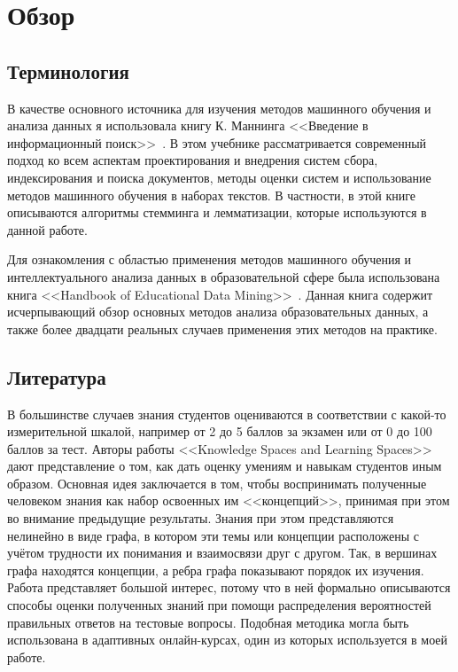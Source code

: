 \documentclass[14pt]{matmex-diploma-custom}
\begin{document}
\section{Обзор}

\subsection{Терминология}
В качестве основного источника для изучения методов машинного обучения и анализа данных я использовала книгу К. Маннинга <<Введение в информационный поиск>>~\cite{alpaydin}. В этом учебнике рассматривается современный подход ко всем аспектам проектирования и внедрения систем сбора, индексирования и поиска документов, методы оценки систем и использование методов машинного обучения в наборах текстов. В частности, в этой книге описываются алгоритмы стемминга и лемматизации, которые используются в данной работе.

Для ознакомления с областью применения методов машинного обучения и интеллектуального анализа данных в образовательной сфере была использована книга <<Handbook of Educational Data Mining>>~\cite{handbook}. Данная книга содержит исчерпывающий обзор основных методов анализа образовательных данных, а также более двадцати реальных случаев применения этих методов на практике.
\subsection{Литература}
В большинстве случаев знания студентов оцениваются в соответствии с какой-то измерительной шкалой, например от 2 до 5 баллов за экзамен или от 0 до 100 баллов за тест. Авторы работы <<Knowledge Spaces and Learning Spaces>>~\cite{knowspaces} дают представление о том, как дать оценку умениям и навыкам студентов иным образом. Основная идея заключается в том, чтобы воспринимать полученные человеком знания как набор освоенных им <<концепций>>, принимая при этом во внимание предыдущие результаты. Знания при этом представляются нелинейно в виде графа, в котором эти темы или концепции расположены с учётом трудности их понимания и взаимосвязи друг с другом. Так, в вершинах графа находятся концепции, а ребра графа показывают порядок их изучения. Работа представляет большой интерес, потому что в ней формально описываются способы оценки полученных знаний при помощи распределения вероятностей правильных ответов на тестовые вопросы. Подобная методика могла быть использована в адаптивных онлайн-курсах, один из которых используется в моей работе.
\end{document}
